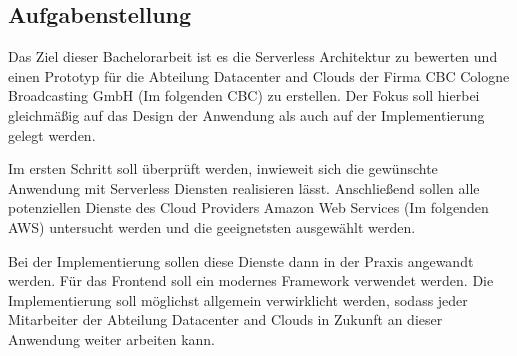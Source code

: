 \subsection{Aufgabenstellung}

Das Ziel dieser Bachelorarbeit ist es die Serverless Architektur zu bewerten und einen Prototyp für die Abteilung Datacenter and Clouds der Firma CBC Cologne Broadcasting GmbH (Im folgenden \glqq CBC\grqq) zu erstellen.
Der Fokus soll hierbei gleichmäßig auf das Design der Anwendung als auch auf der Implementierung gelegt werden.

Im ersten Schritt soll überprüft werden, inwieweit sich die gewünschte Anwendung mit Serverless Diensten realisieren lässt.
Anschließend sollen alle potenziellen Dienste des Cloud Providers Amazon Web Services (Im folgenden \glqq AWS\grqq) untersucht werden und die geeignetsten ausgewählt werden.

Bei der Implementierung sollen diese Dienste dann in der Praxis angewandt werden. Für das Frontend soll ein modernes Framework verwendet werden.
Die Implementierung soll möglichst allgemein verwirklicht werden, sodass jeder Mitarbeiter der Abteilung Datacenter and Clouds in Zukunft an dieser Anwendung weiter arbeiten kann.

